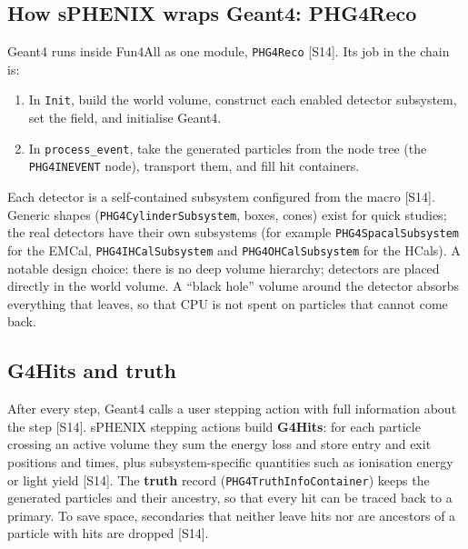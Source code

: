 \documentclass[11pt,letterpaper]{article}
\begin{document}
\subsection{How sPHENIX wraps Geant4: PHG4Reco}
Geant4 runs inside Fun4All as one module, \texttt{PHG4Reco} [S14]. Its job in the chain is:
\begin{enumerate}
\item In \texttt{Init}, build the world volume, construct each enabled detector subsystem, set the field, and initialise Geant4.
\item In \texttt{process\_event}, take the generated particles from the node tree (the \texttt{PHG4INEVENT} node), transport them, and fill hit containers.
\end{enumerate}
Each detector is a self-contained subsystem configured from the macro [S14]. Generic shapes (\texttt{PHG4CylinderSubsystem}, boxes, cones) exist for quick studies;
the real detectors have their own subsystems (for example \texttt{PHG4SpacalSubsystem} for the EMCal, \texttt{PHG4IHCalSubsystem} and \texttt{PHG4OHCalSubsystem} for the HCals).
A notable design choice: there is no deep volume hierarchy; detectors are placed directly in the world volume.
A ``black hole'' volume around the detector absorbs everything that leaves, so that CPU is not spent on particles that cannot come back.

\subsection{G4Hits and truth}
After every step, Geant4 calls a user stepping action with full information about the step [S14].
sPHENIX stepping actions build \textbf{G4Hits}: for each particle crossing an active volume they sum the energy loss and store entry and exit positions and times,
plus subsystem-specific quantities such as ionisation energy or light yield [S14].
The \textbf{truth} record (\texttt{PHG4TruthInfoContainer}) keeps the generated particles and their ancestry, so that every hit can be traced back to a primary.
To save space, secondaries that neither leave hits nor are ancestors of a particle with hits are dropped [S14].
\end{document}
